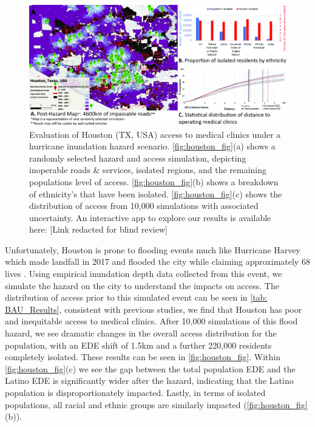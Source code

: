 \documentclass[review,3p,times,onecolumn,sort&compress,12pt]{elsarticle}
\let \cite \parencite
\begin{document}
\begin{figure}[h]
    \includegraphics[width=1\linewidth]{report/fig/tx_fig.jpg}
    \caption{Evaluation of Houston (TX, USA) access to medical clinics under a hurricane inundation hazard scenario. \autoref{fig:houston_fig}(a) shows a randomly selected hazard and access simulation, depicting inoperable roads \& services, isolated regions, and the remaining populations level of access. \autoref{fig:houston_fig}(b) shows a breakdown of ethnicity's that have been isolated. \autoref{fig:houston_fig}(c) shows the distribution of access from 10,000 simulations with associated uncertainty. An interactive app to explore our results is available here: [Link redacted for blind review]}
    \label{fig:houston_fig}
\end{figure}

Unfortunately, Houston is prone to flooding events much like Hurricane Harvey which made landfall in 2017 and flooded the city while claiming approximately 68 lives \cite{FEMA_Data}.
Using empirical inundation depth data collected from this event, we simulate the hazard on the city to understand the impacts on access.
The distribution of access prior to this simulated event can be seen in \autoref{tab: BAU_Results}, consistent with previous studies, we find that Houston has poor and inequitable access to medical clinics.
After 10,000 simulations of this flood hazard, we see dramatic changes in the overall access distribution for the population, with an EDE shift of 1.5km and a further 220,000 residents completely isolated.
These results can be seen in \autoref{fig:houston_fig}.
Within \autoref{fig:houston_fig}(c) we see the gap between the total population EDE and the Latino EDE is significantly wider after the hazard, indicating that the Latino population is disproportionately impacted.
Lastly, in terms of isolated populations, all racial and ethnic groups are similarly impacted (\autoref{fig:houston_fig}(b)).
\end{document}
